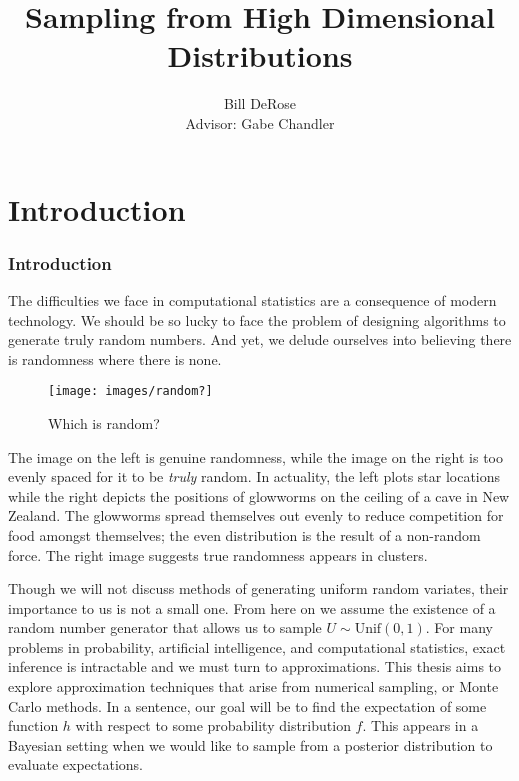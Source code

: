 \documentclass[11pt, a4paper]{article}
\title{Sampling from High Dimensional Distributions}
\author{Bill DeRose \\ Advisor: Gabe Chandler}
\theoremstyle{plain}
\theoremstyle{definition}
\begin{document}


\maketitle
\tableofcontents
\part{Introduction}
\section{Introduction}
The  difficulties we face in computational statistics are a consequence of modern technology.
We should be so lucky to face the problem of designing algorithms to generate truly random numbers. And yet, we delude ourselves into believing there is randomness where there is none.

\begin{figure}[!htbp]
   \centering
   \texttt{[image: images/random?]} %
   \caption{Which is random?}
   \label{fig:example}
\end{figure}
The image on the left is genuine randomness, while the image on the right is too evenly spaced for it to be \emph{truly} random. In actuality, the left plots star locations while the right depicts the positions of glowworms on the ceiling of a cave in New Zealand. The glowworms spread themselves out evenly to reduce competition for food amongst themselves; the even distribution is the result of a non-random force. The right image suggests true randomness appears in clusters.

Though we will not discuss methods of generating uniform random variates, their importance to us
is not a small one. From here on we assume the existence of a random
number generator that allows us to sample $U \sim \mbox{Unif}(0,1)$. For many problems in probability, artificial intelligence, and computational statistics, exact inference is intractable and we must turn to approximations. This thesis aims to explore approximation techniques that arise from numerical sampling, or Monte Carlo methods. In a sentence, our goal will be to find the expectation of some function $h$ with respect to some probability distribution $f$. This appears in a Bayesian  setting when we would like to sample from a posterior distribution to evaluate expectations.
\end{document}
